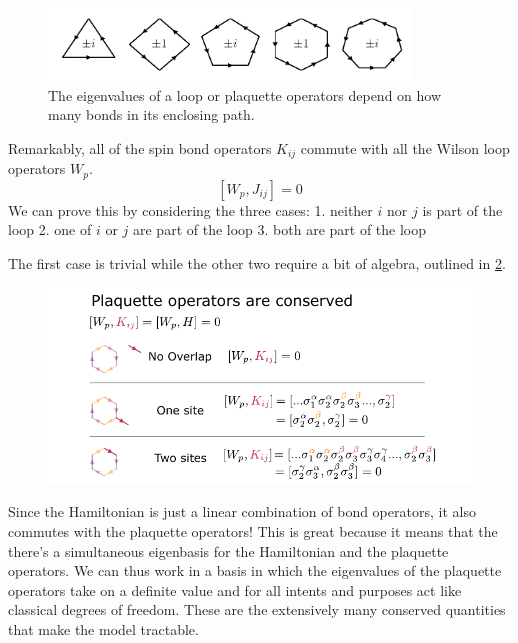 \begin{figure}
\hypertarget{fig:regular_plaquettes}{%
\centering
\includegraphics[width=0.86\textwidth,height=\textheight]{figure_code/amk_chapter/regular_plaquettes/regular_plaquettes.pdf}
\caption{The eigenvalues of a loop or plaquette operators depend on how
many bonds in its enclosing path.}\label{fig:regular_plaquettes}
}
\end{figure}

Remarkably, all of the spin bond operators \(K_{ij}\) commute with all
the Wilson loop operators \(W_p\). \[[W_p, J_{ij}] = 0\] We can prove
this by considering the three cases: 1. neither \(i\) nor \(j\) is part
of the loop 2. one of \(i\) or \(j\) are part of the loop 3. both are
part of the loop

The first case is trivial while the other two require a bit of algebra,
outlined in \cref{fig:visual_kitaev_2}.

\begin{figure}
\hypertarget{fig:visual_kitaev_2}{%
\centering
\includegraphics[width=1.43\textwidth,height=\textheight]{figure_code/amk_chapter/visual_kitaev_2.pdf}
\caption{}\label{fig:visual_kitaev_2}
}
\end{figure}

Since the Hamiltonian is just a linear combination of bond operators, it
also commutes with the plaquette operators! This is great because it
means that the there's a simultaneous eigenbasis for the Hamiltonian and
the plaquette operators. We can thus work in a basis in which the
eigenvalues of the plaquette operators take on a definite value and for
all intents and purposes act like classical degrees of freedom. These
are the extensively many conserved quantities that make the model
tractable.

